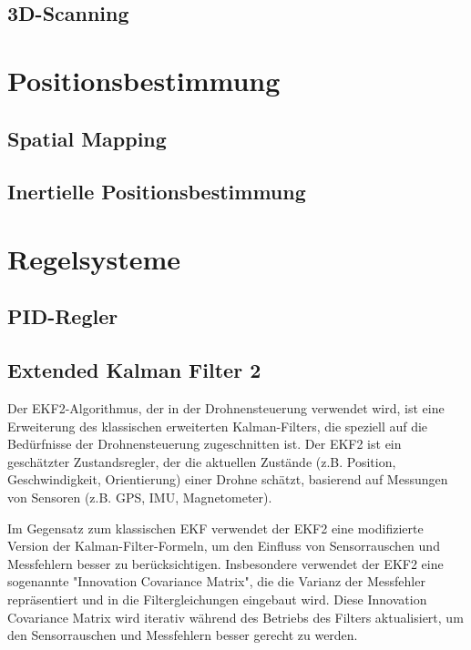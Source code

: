     \subsection{3D-Scanning} \label{3d-scanning:subsection}

\section{Positionsbestimmung} \label{positionsbestimmung:section}

    \subsection{Spatial Mapping} \label{spatial_mapping:subsection}

    \subsection{Inertielle Positionsbestimmung} \label{inertielle_positionsbestimmung:subsection}

\section{Regelsysteme} \label{regelsysteme:section}

    \subsection{PID-Regler} \label{pid_regler:subsection}

    \subsection{Extended Kalman Filter 2}
    Der \ac{EKF}2-Algorithmus, der in der Drohnensteuerung verwendet wird, ist eine Erweiterung des klassischen erweiterten Kalman-Filters, die speziell auf die Bedürfnisse der Drohnensteuerung zugeschnitten ist. Der EKF2 ist ein geschätzter Zustandsregler, der die aktuellen Zustände (z.B. Position, Geschwindigkeit, Orientierung) einer Drohne schätzt, basierend auf Messungen von Sensoren (z.B. \ac{GPS}, \ac{IMU}, Magnetometer).

Im Gegensatz zum klassischen EKF verwendet der EKF2 eine modifizierte Version der Kalman-Filter-Formeln, um den Einfluss von Sensorrauschen und Messfehlern besser zu berücksichtigen. Insbesondere verwendet der EKF2 eine sogenannte "Innovation Covariance Matrix", die die Varianz der Messfehler repräsentiert und in die Filtergleichungen eingebaut wird. Diese Innovation Covariance Matrix wird iterativ während des Betriebs des Filters aktualisiert, um den Sensorrauschen und Messfehlern besser gerecht zu werden.

